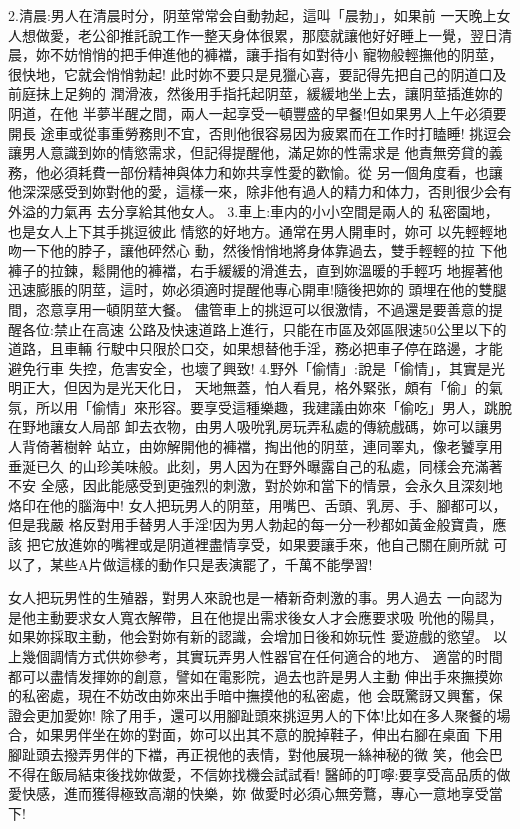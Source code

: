 \documentclass[12pt,UTF8]{ctexbook}
\begin{document}
2.清晨:男人在清晨时分，阴莖常常会自動勃起，這叫「晨勃」，如果前
一天晚上女人想做愛，老公卻推託說工作一整天身体很累，那麼就讓他好好睡上一覺，翌日清晨，妳不妨悄悄的把手伸進他的褲襠，讓手指有如對待小
寵物般輕撫他的阴莖，很快地，它就会悄悄勃起!
此时妳不要只是見獵心喜，要記得先把自己的阴道口及前庭抹上足夠的
潤滑液，然後用手指托起阴莖，緩緩地坐上去，讓阴莖插進妳的阴道，在他
半夢半醒之間，兩人一起享受一頓豐盛的早餐!但如果男人上午必須要開長
途車或從事重勞務則不宜，否則他很容易因为疲累而在工作时打瞌睡!
挑逗会讓男人意識到妳的情慾需求，但記得提醒他，滿足妳的性需求是
他責無旁貸的義務，他必須耗費一部份精神與体力和妳共享性愛的歡愉。從
另一個角度看，也讓他深深感受到妳對他的愛，這樣一來，除非他有過人的精力和体力，否則很少会有外溢的力氣再
去分享給其他女人。
3.車上:車内的小小空間是兩人的
私密園地，也是女人上下其手挑逗彼此
情慾的好地方。通常在男人開車时，妳可
以先輕輕地吻一下他的脖子，讓他砰然心
動，然後悄悄地將身体靠過去，雙手輕輕的拉
下他褲子的拉鍊，鬆開他的褲襠，右手緩緩的滑進去，直到妳溫暖的手輕巧
地握著他迅速膨脹的阴莖，這时，妳必須適时提醒他專心開車!隨後把妳的
頭埋在他的雙腿間，恣意享用一頓阴莖大餐。
儘管車上的挑逗可以很激情，不過還是要善意的提醒各位:禁止在高速
公路及快速道路上進行，只能在市區及郊區限速50公里以下的道路，且車輛
行駛中只限於口交，如果想替他手淫，務必把車子停在路邊，才能避免行車
失控，危害安全，也壞了興致!
4.野外「偷情」:說是「偷情」，其實是光明正大，但因为是光天化日，
天地無蓋，怕人看見，格外緊张，頗有「偷」的氣氛，所以用「偷情」來形容。要享受這種樂趣，我建議由妳來「偷吃」男人，跳脫在野地讓女人局部
卸去衣物，由男人吸吮乳房玩弄私處的傳統戲碼，妳可以讓男人背倚著樹幹
站立，由妳解開他的褲襠，掏出他的阴莖，連同睪丸，像老饕享用垂涎已久
的山珍美味般。此刻，男人因为在野外曝露自己的私處，同樣会充滿著不安
全感，因此能感受到更強烈的刺激，對於妳和當下的情景，会永久且深刻地
烙印在他的腦海中!
女人把玩男人的阴莖，用嘴巴、舌頭、乳房、手、腳都可以，但是我嚴
格反對用手替男人手淫!因为男人勃起的每一分一秒都如黃金般寶貴，應該
把它放進妳的嘴裡或是阴道裡盡情享受，如果要讓手來，他自己關在廁所就
可以了，某些A片做這樣的動作只是表演罷了，千萬不能學習!

女人把玩男性的生殖器，對男人來說也是一樁新奇刺激的事。男人過去
一向認为是他主動要求女人寬衣解帶，且在他提出需求後女人才会應要求吸
吮他的陽具，如果妳採取主動，他会對妳有新的認識，会增加日後和妳玩性
愛遊戲的慾望。
以上幾個調情方式供妳參考，其實玩弄男人性器官在任何適合的地方、
適當的时間都可以盡情发揮妳的創意，譬如在電影院，過去也許是男人主動
伸出手來撫摸妳的私密處，現在不妨改由妳來出手暗中撫摸他的私密處，他
会既驚訝又興奮，保證会更加愛妳!
除了用手，還可以用腳趾頭來挑逗男人的下体!比如在多人聚餐的場
合，如果男伴坐在妳的對面，妳可以出其不意的脫掉鞋子，伸出右腳在桌面
下用腳趾頭去撥弄男伴的下襠，再正視他的表情，對他展現一絲神秘的微
笑，他会巴不得在飯局結束後找妳做愛，不信妳找機会試試看!
醫師的叮嚀:要享受高品质的做愛快感，進而獲得極致高潮的快樂，妳
做愛时必須心無旁鶩，專心一意地享受當下!
\end{document}
